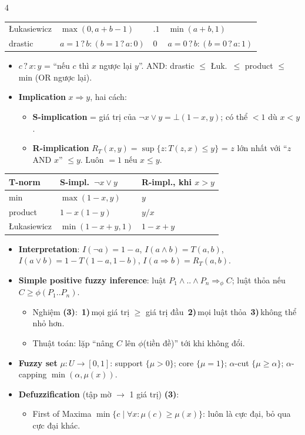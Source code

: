 \documentclass[10pt]{article}
\newcommand{\kw}[1]{\textbf{#1}}
\newcommand{\cnt}[1]{{\color{h2}\bfseries(#1)}}
\newcommand{\n}[1]{\,{\color{h2}\bfseries#1)}\,}
\begin{document}
\begin{multicols*}{4}
\begin{tabular}{@{}l|l|l|l@{}}
\L ukasiewicz & $\max(0,a+b-1)$ & $.1$ & $\min(a+b,1)$\\
drastic & $a{=}1\,?\,b:(b{=}1\,?\,a:0)$ & $0$ & $a{=}0\,?\,b:(b{=}0\,?\,a:1)$\\
\end{tabular}
\begin{itemize}
\item $c\,?\,x:y$ = ``nếu $c$ thì $x$ ngược lại $y$''. AND: drastic $\le$ \L uk.\ $\le$ product $\le$ min (OR ngược lại).
\item \kw{Implication} $x\Rightarrow y$, hai cách:
\begin{itemize}
\item \kw{S-implication} = giá trị của $\neg x\vee y=\bot(1-x,y)$; có thể $<1$ dù $x<y$.
\item \kw{R-implication} $R_T(x,y)=\sup\{z: T(z,x)\le y\}$ = $z$ lớn nhất với ``$z$ AND $x$'' $\le y$. Luôn $=1$ nếu $x\le y$.
\end{itemize}
\end{itemize}
\begin{tabular}{@{}l|l|l@{}}
T-norm & S-impl.\ $\neg x\vee y$ & R-impl., khi $x>y$\\\hline
min & $\max(1-x,y)$ & $y$\\
product & $1-x(1-y)$ & $y/x$\\
\L ukasiewicz & $\min(1-x+y,1)$ & $1-x+y$\\
\end{tabular}
\begin{itemize}
\item \kw{Interpretation}: $I(\neg a)=1-a$, $I(a\wedge b)=T(a,b)$, $I(a\vee b)=1-T(1-a,1-b)$, $I(a\Rightarrow b)=R_T(a,b)$.
\item \kw{Simple positive fuzzy inference}: luật $P_1\wedge..\wedge P_n\Rightarrow_\phi C$; luật thỏa nếu $C\ge\phi(P_1..P_n)$.
\begin{itemize}
\item Nghiệm \cnt{3}: \n1mọi giá trị $\ge$ giá trị đầu \n2mọi luật thỏa \n3không thể nhỏ hơn.
\item Thuật toán: lặp ``nâng $C$ lên $\phi$(tiền đề)'' tới khi không đổi.
\end{itemize}
\item \kw{Fuzzy set} $\mu:U\to[0,1]$: support $\{\mu>0\}$; core $\{\mu=1\}$; $\alpha$-cut $\{\mu\ge\alpha\}$; $\alpha$-capping $\min(\alpha,\mu(x))$.
\item \kw{Defuzzification} (tập mờ $\to$ 1 giá trị) \cnt{3}:
\begin{itemize}
\item First of Maxima $\min\{c\mid\forall x:\mu(c)\ge\mu(x)\}$: luôn là cực đại, bỏ qua cực đại khác.

\end{itemize}
\end{itemize}
\end{multicols*}
\end{document}
